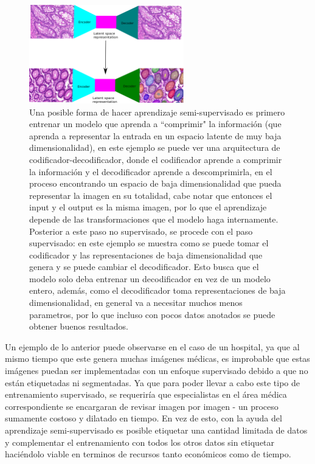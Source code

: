 \documentclass[12pt,letterpaper,final, openany]{scrbook}
\begin{document}
\begin{figure}[h!]
    \centering
    \includegraphics[width=0.6\textwidth]{encoder_decoder.png}
    \caption{Una posible forma de hacer aprendizaje semi-supervisado es primero entrenar un modelo que aprenda a ``comprimir" la información (que aprenda a representar la entrada en un espacio latente de muy baja dimensionalidad), en este ejemplo se puede ver una arquitectura de codificador-decodificador, donde el codificador aprende a comprimir la información y el decodificador aprende a descomprimirla, en el proceso encontrando un espacio de baja dimensionalidad que pueda representar la imagen en su totalidad, cabe notar que entonces el input y el output es la misma imagen, por lo que el aprendizaje depende de las transformaciones que el modelo haga internamente. Posterior a este paso no supervisado, se procede con el paso supervisado: en este ejemplo se muestra como se puede tomar el codificador y las representaciones de baja dimensionalidad que genera y se puede cambiar el decodificador. Esto busca que el modelo solo deba entrenar un decodificador en vez de un modelo entero, además, como el decodificador toma representaciones de baja dimensionalidad, en general va a necesitar muchos menos parametros, por lo que incluso con pocos datos anotados se puede obtener buenos resultados.}
    \label{fig:encoder_decoder}
\end{figure}

Un ejemplo de lo anterior puede observarse en el caso de un hospital, ya que al mismo tiempo que este genera muchas imágenes médicas, es improbable que estas imágenes puedan ser implementadas con un enfoque supervisado debido a que no están etiquetadas ni segmentadas. Ya que para poder llevar a cabo este tipo de entrenamiento supervisado, se requeriría que especialistas en el área médica correspondiente se encargaran de revisar imagen por imagen - un proceso sumamente costoso y dilatado en tiempo. En vez de esto, con la ayuda del aprendizaje semi-supervisado es posible etiquetar una cantidad limitada de datos y complementar el entrenamiento con todos los otros datos sin etiquetar haciéndolo viable en terminos de recursos tanto económicos como de tiempo. 
\end{document}
